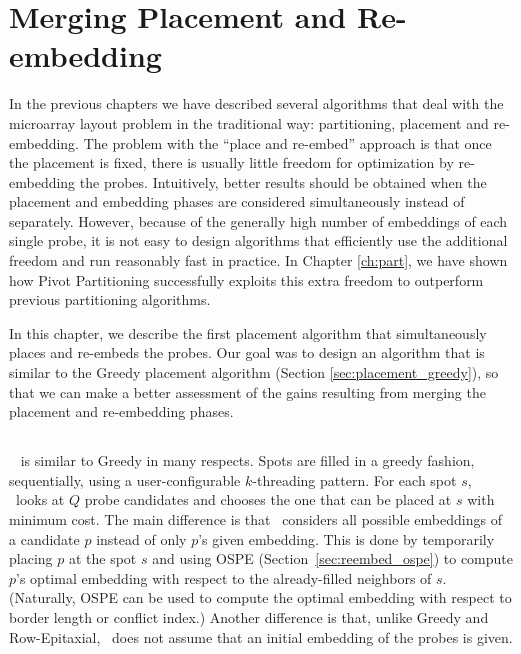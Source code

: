 \chapter{Merging Placement and Re-embedding}
\label{ch:merge}

In the previous chapters we have described several algorithms that deal with the
microarray layout problem in the traditional way: partitioning, placement and
re-embedding. The problem with the ``place and re-embed'' approach is that once
the placement is fixed, there is usually little freedom for optimization by
re-embedding the probes. Intuitively, better results should be obtained when the
placement and embedding phases are considered simultaneously instead of
separately. However, because of the generally high number of embeddings of each
single probe, it is not easy to design algorithms that efficiently use the
additional freedom and run reasonably fast in practice. In Chapter
\ref{ch:part}, we have shown how Pivot Partitioning successfully exploits this
extra freedom to outperform previous partitioning algorithms.

In this chapter, we describe the first placement algorithm that simultaneously
places and re-embeds the probes. Our goal was to design an algorithm that is
similar to the Greedy placement algorithm (Section \ref{sec:placement_greedy}),
so that we can make a better assessment of the gains resulting from merging the
placement and re-embedding phases.

\section{\Greedyplus}
\label{sec:merge_greedyplus}

\Greedyplus\ \cite{Carvalho2007} is similar to Greedy in many respects. Spots
are filled in a greedy fashion, sequentially, using a user-configurable
$k$-threading pattern. For each spot $s$, \Greedyplus\ looks at $Q$ probe
candidates and chooses the one that can be placed at $s$ with minimum cost. The
main difference is that \Greedyplus\ considers all possible embeddings of a
candidate $p$ instead of only $p$'s given embedding. This is done by temporarily
placing $p$ at the spot $s$ and using OSPE (Section~\ref{sec:reembed_ospe}) to
compute $p$'s optimal embedding with respect to the already-filled neighbors of
$s$. (Naturally, OSPE can be used to compute the optimal embedding with respect
to border length or conflict index.) Another difference is that, unlike Greedy
and Row-Epitaxial, \Greedyplus\ does not assume that an initial embedding of the
probes is given.


